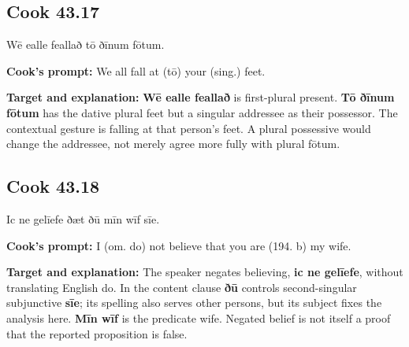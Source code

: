 \par\begin{minipage}{\linewidth}\raggedright
\subsection*{Cook 43.17}

Wē ealle feallað tō ðīnum fōtum.

\textbf{Cook's prompt:} We all fall at (tō) your (sing.) feet.

\textbf{Target and explanation:} \textbf{Wē ealle feallað} is first-plural present. \textbf{Tō ðīnum fōtum} has the dative plural feet but a singular addressee as their possessor. The contextual gesture is falling at that person's feet. A plural possessive would change the addressee, not merely agree more fully with plural fōtum.

\end{minipage}\par\addvspace{4pt}

\par\begin{minipage}{\linewidth}\raggedright
\subsection*{Cook 43.18}

Ic ne gelīefe ðæt ðū mīn wīf sīe.

\textbf{Cook's prompt:} I (om. do) not believe that you are (194. b) my wife.

\textbf{Target and explanation:} The speaker negates believing, \textbf{ic ne gelīefe}, without translating English do. In the content clause \textbf{ðū} controls second-singular subjunctive \textbf{sīe}; its spelling also serves other persons, but its subject fixes the analysis here. \textbf{Mīn wīf} is the predicate wife. Negated belief is not itself a proof that the reported proposition is false.

\end{minipage}\par\addvspace{4pt}

